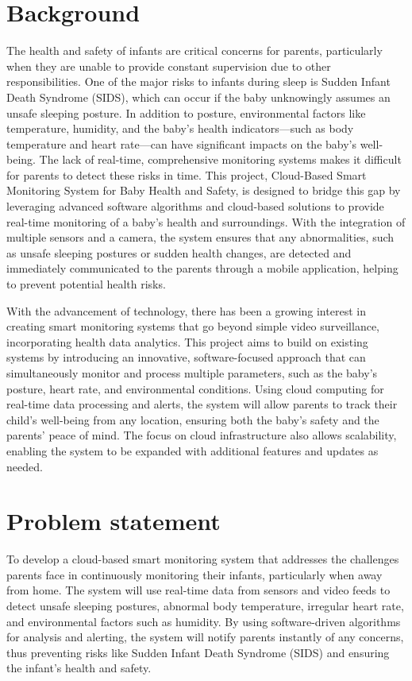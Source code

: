 \documentclass[12pt,a4paper]{report}
\begin{document}
\section{Background}
The health and safety of infants are critical concerns for parents, particularly when they are unable to provide constant supervision due to other responsibilities. One of the major risks to infants during sleep is Sudden Infant Death Syndrome (SIDS), which can occur if the baby unknowingly assumes an unsafe sleeping posture. In addition to posture, environmental factors like temperature, humidity, and the baby’s health indicators—such as body temperature and heart rate—can have significant impacts on the baby’s well-being. The lack of real-time, comprehensive monitoring systems makes it difficult for parents to detect these risks in time. This project, Cloud-Based Smart Monitoring System for Baby Health and Safety, is designed to bridge this gap by leveraging advanced software algorithms and cloud-based solutions to provide real-time monitoring of a baby’s health and surroundings. With the integration of multiple sensors and a camera, the system ensures that any abnormalities, such as unsafe sleeping postures or sudden health changes, are detected and immediately communicated to the parents through a mobile application, helping to prevent potential health risks.

With the advancement of technology, there has been a growing interest in creating smart monitoring systems that go beyond simple video surveillance, incorporating health data analytics. This project aims to build on existing systems by introducing an innovative, software-focused approach that can simultaneously monitor and process multiple parameters, such as the baby’s posture, heart rate, and environmental conditions. Using cloud computing for real-time data processing and alerts, the system will allow parents to track their child’s well-being from any location, ensuring both the baby’s safety and the parents’ peace of mind. The focus on cloud infrastructure also allows scalability, enabling the system to be expanded with additional features and updates as needed.

\section{Problem statement }
To develop a cloud-based smart monitoring system that addresses the challenges parents face in continuously monitoring their infants, particularly when away from home. The system will use real-time data from sensors and video feeds to detect unsafe sleeping postures, abnormal body temperature, irregular heart rate, and environmental factors such as humidity. By using software-driven algorithms for analysis and alerting, the system will notify parents instantly of any concerns, thus preventing risks like Sudden Infant Death Syndrome (SIDS) and ensuring the infant's health and safety.
\end{document}
